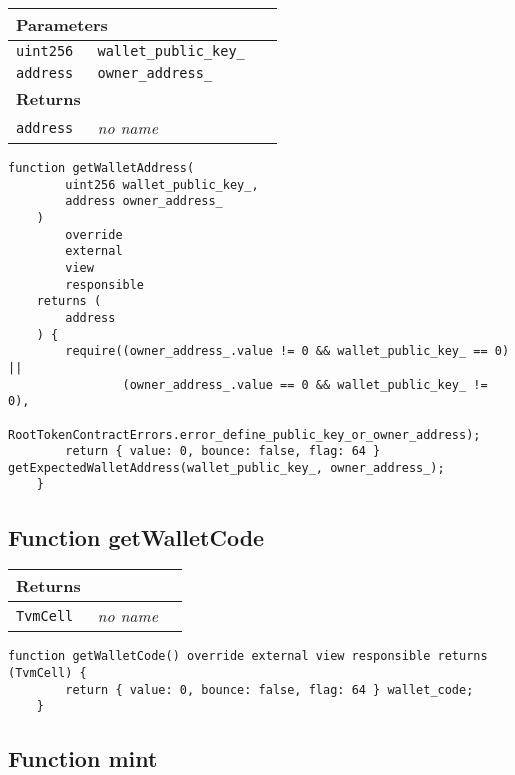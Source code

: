 \ifsoltables
\noindent\begin{tabular}{|l|l|p{5cm}|}\hline
\multicolumn{3}{|l|}{\bf Parameters}\\\hline
\tt uint256 & \tt wallet\_{}public\_{}key\_{} &\\\hline
\tt address & \tt owner\_{}address\_{} &\\\hline
\multicolumn{3}{|l|}{\bf Returns}\\\hline
\tt address & {\em no name} &\\\hline
\end{tabular}
\fi

\vspace{2cm}

\begin{lstlisting}[firstnumber=111]
    function getWalletAddress(
        uint256 wallet_public_key_,
        address owner_address_
    )
        override
        external
        view
        responsible
    returns (
        address
    ) {
        require((owner_address_.value != 0 && wallet_public_key_ == 0) ||
                (owner_address_.value == 0 && wallet_public_key_ != 0),
                RootTokenContractErrors.error_define_public_key_or_owner_address);
        return { value: 0, bounce: false, flag: 64 } getExpectedWalletAddress(wallet_public_key_, owner_address_);
    }
\end{lstlisting}

\subsection{Function getWalletCode}


\ifsoltables
\noindent\begin{tabular}{|l|l|p{5cm}|}\hline
\multicolumn{3}{|l|}{\bf Returns}\\\hline
\tt TvmCell & {\em no name} &\\\hline
\end{tabular}
\fi

\vspace{2cm}

\begin{lstlisting}[firstnumber=100]
    function getWalletCode() override external view responsible returns (TvmCell) {
        return { value: 0, bounce: false, flag: 64 } wallet_code;
    }
\end{lstlisting}

\subsection{Function mint}


